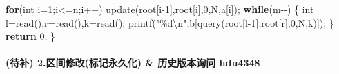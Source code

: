 \documentclass[
]{article}
\newenvironment{Shaded}{}{}
\newcommand{\ControlFlowTok}[1]{\textcolor[rgb]{0.00,0.44,0.13}{\textbf{#1}}}
\newcommand{\DataTypeTok}[1]{\textcolor[rgb]{0.56,0.13,0.00}{#1}}
\newcommand{\DecValTok}[1]{\textcolor[rgb]{0.25,0.63,0.44}{#1}}
\newcommand{\NormalTok}[1]{#1}
\newcommand{\SpecialCharTok}[1]{\textcolor[rgb]{0.25,0.44,0.63}{#1}}
\newcommand{\StringTok}[1]{\textcolor[rgb]{0.25,0.44,0.63}{#1}}
\begin{document}
\begin{Shaded}
\begin{Highlighting}[]
    \ControlFlowTok{for}\NormalTok{(}\DataTypeTok{int}\NormalTok{ i=}\DecValTok{1}\NormalTok{;i\textless{}=n;i++) update(root[i{-}}\DecValTok{1}\NormalTok{],root[i],}\DecValTok{0}\NormalTok{,N,a[i]);}
    \ControlFlowTok{while}\NormalTok{(m{-}{-})}
\NormalTok{    \{}
        \DataTypeTok{int}\NormalTok{ l=read(),r=read(),k=read();}
\NormalTok{        printf(}\StringTok{"}\SpecialCharTok{\%d\textbackslash{}n}\StringTok{"}\NormalTok{,b[query(root[l{-}}\DecValTok{1}\NormalTok{],root[r],}\DecValTok{0}\NormalTok{,N,k)]);}
\NormalTok{    \}}
    \ControlFlowTok{return} \DecValTok{0}\NormalTok{;}
\NormalTok{\}}
\end{Highlighting}
\end{Shaded}

\hypertarget{ux5f85ux8865-2.ux533aux95f4ux4feeux6539ux6807ux8bb0ux6c38ux4e45ux5316-ux5386ux53f2ux7248ux672cux8be2ux95ee-hdu4348}{%
\paragraph{(待补) 2.区间修改(标记永久化) \& 历史版本询问
hdu4348}\label{ux5f85ux8865-2.ux533aux95f4ux4feeux6539ux6807ux8bb0ux6c38ux4e45ux5316-ux5386ux53f2ux7248ux672cux8be2ux95ee-hdu4348}}
\end{document}
